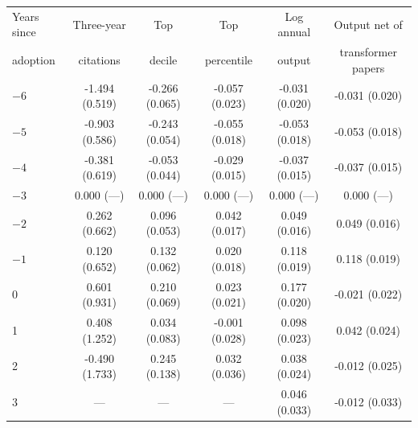\begin{tabular}{lccccc}
\toprule
Years since & Three-year & Top & Top & Log annual & Output net of \\
adoption & citations & decile & percentile & output & transformer papers \\
\midrule
$-6$ & -1.494 (0.519) & -0.266 (0.065) & -0.057 (0.023) & -0.031 (0.020) & -0.031 (0.020) \\
$-5$ & -0.903 (0.586) & -0.243 (0.054) & -0.055 (0.018) & -0.053 (0.018) & -0.053 (0.018) \\
$-4$ & -0.381 (0.619) & -0.053 (0.044) & -0.029 (0.015) & -0.037 (0.015) & -0.037 (0.015) \\
$-3$ & 0.000 (---) & 0.000 (---) & 0.000 (---) & 0.000 (---) & 0.000 (---) \\
$-2$ & 0.262 (0.662) & 0.096 (0.053) & 0.042 (0.017) & 0.049 (0.016) & 0.049 (0.016) \\
$-1$ & 0.120 (0.652) & 0.132 (0.062) & 0.020 (0.018) & 0.118 (0.019) & 0.118 (0.019) \\
0 & 0.601 (0.931) & 0.210 (0.069) & 0.023 (0.021) & 0.177 (0.020) & -0.021 (0.022) \\
1 & 0.408 (1.252) & 0.034 (0.083) & -0.001 (0.028) & 0.098 (0.023) & 0.042 (0.024) \\
2 & -0.490 (1.733) & 0.245 (0.138) & 0.032 (0.036) & 0.038 (0.024) & -0.012 (0.025) \\
3 & --- & --- & --- & 0.046 (0.033) & -0.012 (0.033) \\
\bottomrule
\end{tabular}
